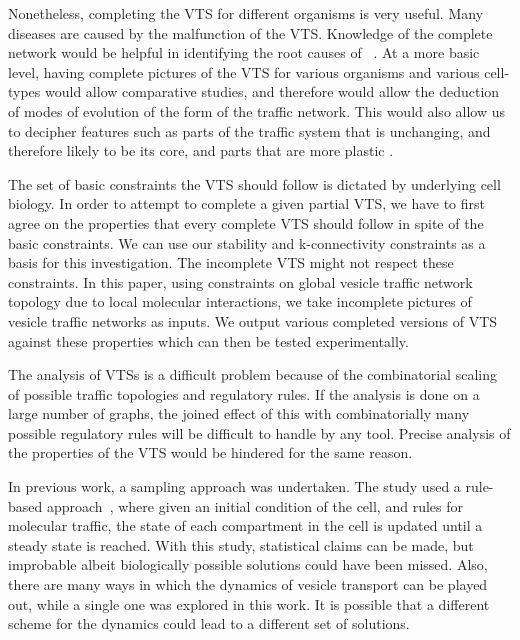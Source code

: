 Nonetheless, completing the VTS for different organisms is very useful. 
%
Many diseases are caused by the malfunction of the VTS. 
%
Knowledge of the complete network would be helpful in identifying the root causes of ~\cite{bexiga2013human,gissen2007cargos}. 
%
At a more basic level, having complete pictures of the VTS for various organisms and various cell-types would allow comparative studies, and therefore would allow the deduction of modes of evolution of the form of the traffic network. 
%
This would also allow us to decipher features such as parts of the traffic system that is unchanging, and therefore likely to be its core, and parts that are more plastic \cite{barlow2017seeing}.

%
The set of basic constraints the VTS should follow is dictated by underlying cell biology.   
%
In order to attempt to complete a given partial VTS, we have to first agree on the properties that every complete VTS should follow in spite of the basic constraints. 
%
We can use our stability and k-connectivity constraints as a basis for this investigation.   
%
The incomplete VTS might not respect these constraints. 
%
In this paper, using constraints on global vesicle traffic network topology due to local molecular interactions, we take incomplete pictures of vesicle traffic networks as inputs.
%
We output various completed versions of VTS against these properties which can then be tested experimentally.
%

The analysis of VTSs is a difficult problem because
of the combinatorial scaling of possible traffic topologies and
regulatory rules.
%
If the analysis is done on a large number of graphs, the joined effect of this with combinatorially many possible regulatory rules will be difficult to handle by any tool.
%
Precise analysis of the properties of the VTS would be hindered for the same reason. 

In previous work, a sampling approach was undertaken. 
%
The study used a rule-based approach~\cite{mani2016stacking}, where given an initial condition of the cell, and rules for molecular traffic, the state of each compartment in the cell is updated until a steady state is reached. 
%
With this study, statistical claims can be made, but improbable albeit biologically possible solutions could have been missed.
%
Also, there are many ways in which the dynamics of vesicle transport can be played out, while a single one was explored in this work. 
%
It is possible that a different scheme for the dynamics could lead to a different set of solutions.

